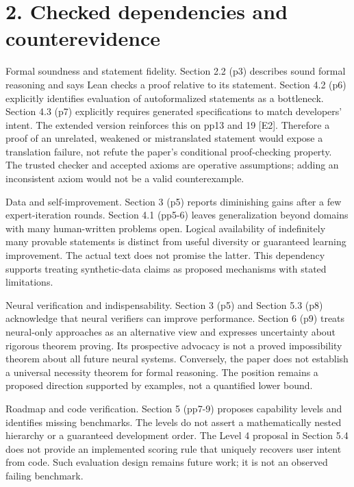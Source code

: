 \documentclass[10pt]{article}
\begin{document}
\section*{2. Checked dependencies and counterevidence}
Formal soundness and statement fidelity. Section 2.2 (p3) describes sound formal reasoning and says Lean checks a proof relative to its statement. Section 4.2 (p6) explicitly identifies evaluation of autoformalized statements as a bottleneck. Section 4.3 (p7) explicitly requires generated specifications to match developers’ intent. The extended version reinforces this on pp13 and 19 [E2]. Therefore a proof of an unrelated, weakened or mistranslated statement would expose a translation failure, not refute the paper’s conditional proof-checking property. The trusted checker and accepted axioms are operative assumptions; adding an inconsistent axiom would not be a valid counterexample.\par
Data and self-improvement. Section 3 (p5) reports diminishing gains after a few expert-iteration rounds. Section 4.1 (pp5-6) leaves generalization beyond domains with many human-written problems open. Logical availability of indefinitely many provable statements is distinct from useful diversity or guaranteed learning improvement. The actual text does not promise the latter. This dependency supports treating synthetic-data claims as proposed mechanisms with stated limitations.\par
Neural verification and indispensability. Section 3 (p5) and Section 5.3 (p8) acknowledge that neural verifiers can improve performance. Section 6 (p9) treats neural-only approaches as an alternative view and expresses uncertainty about rigorous theorem proving. Its prospective advocacy is not a proved impossibility theorem about all future neural systems. Conversely, the paper does not establish a universal necessity theorem for formal reasoning. The position remains a proposed direction supported by examples, not a quantified lower bound.\par
Roadmap and code verification. Section 5 (pp7-9) proposes capability levels and identifies missing benchmarks. The levels do not assert a mathematically nested hierarchy or a guaranteed development order. The Level 4 proposal in Section 5.4 does not provide an implemented scoring rule that uniquely recovers user intent from code. Such evaluation design remains future work; it is not an observed failing benchmark.\par
\end{document}
